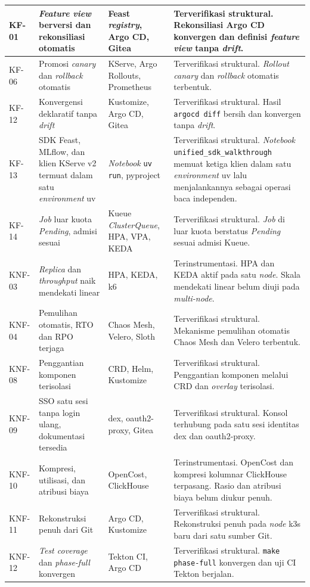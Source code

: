 {\begin{longtable}{|>{\centering\arraybackslash}m{1.7cm}|m{3.9cm}|m{2.8cm}|m{4.4cm}|}
KF-01 & \textit{Feature view} berversi dan rekonsiliasi otomatis & Feast \textit{registry}, Argo CD, Gitea & Terverifikasi struktural. Rekonsiliasi Argo CD konvergen dan definisi \textit{feature view} tanpa \textit{drift}. \\
\hline
KF-06 & Promosi \textit{canary} dan \textit{rollback} otomatis & KServe, Argo Rollouts, Prometheus & Terverifikasi struktural. \textit{Rollout} \textit{canary} dan \textit{rollback} otomatis terbentuk. \\
\hline
KF-12 & Konvergensi deklaratif tanpa \textit{drift} & Kustomize, Argo CD, Gitea & Terverifikasi struktural. Hasil \texttt{argocd diff} bersih dan konvergen tanpa \textit{drift}. \\
\hline
KF-13 & SDK Feast, MLflow, dan klien KServe v2 termuat dalam satu \textit{environment} uv & \textit{Notebook} \texttt{uv run}, pyproject & Terverifikasi struktural. \textit{Notebook} \texttt{unified\_sdk\_walkthrough} memuat ketiga klien dalam satu \textit{environment} uv lalu menjalankannya sebagai operasi baca independen. \\
\hline
KF-14 & \textit{Job} luar kuota \textit{Pending}, admisi sesuai & Kueue \textit{ClusterQueue}, HPA, VPA, KEDA & Terverifikasi struktural. \textit{Job} di luar kuota berstatus \textit{Pending} sesuai admisi Kueue. \\
\hline
KNF-03 & \textit{Replica} dan \textit{throughput} naik mendekati linear & HPA, KEDA, k6 & Terinstrumentasi. HPA dan KEDA aktif pada satu \textit{node}. Skala mendekati linear belum diuji pada \textit{multi-node}. \\
\hline
KNF-04 & Pemulihan otomatis, RTO dan RPO terjaga & Chaos Mesh, Velero, Sloth & Terverifikasi struktural. Mekanisme pemulihan otomatis Chaos Mesh dan Velero terbentuk. \\
\hline
KNF-08 & Penggantian komponen terisolasi & CRD, Helm, Kustomize & Terverifikasi struktural. Penggantian komponen melalui CRD dan \textit{overlay} terisolasi. \\
\hline
KNF-09 & SSO satu sesi tanpa login ulang, dokumentasi tersedia & dex, oauth2-proxy, Gitea & Terverifikasi struktural. Konsol terhubung pada satu sesi identitas dex dan oauth2-proxy. \\
\hline
KNF-10 & Kompresi, utilisasi, dan atribusi biaya & OpenCost, ClickHouse & Terinstrumentasi. OpenCost dan kompresi kolumnar ClickHouse terpasang. Rasio dan atribusi biaya belum diukur penuh. \\
\hline
KNF-11 & Rekonstruksi penuh dari Git & Argo CD, Kustomize & Terverifikasi struktural. Rekonstruksi penuh pada \textit{node} k3s baru dari satu sumber Git. \\
\hline
KNF-12 & \textit{Test coverage} dan \textit{phase-full} konvergen & Tekton CI, Argo CD & Terverifikasi struktural. \texttt{make phase-full} konvergen dan uji CI Tekton berjalan. \\
\hline
\end{longtable}
}
